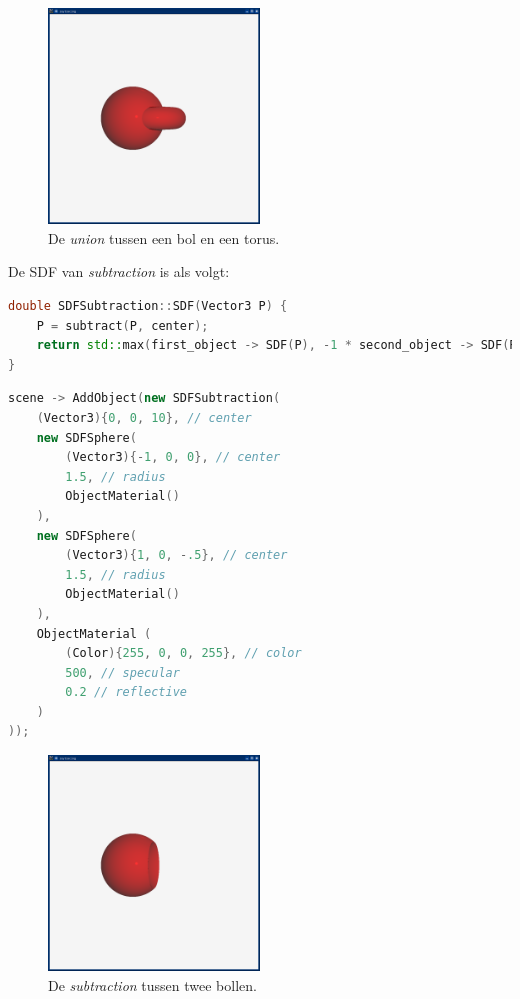 \documentclass[12pt, a4paper]{article}
\begin{document}
\begin{figure}[h]
    \centering
    \includegraphics[width=0.50\textwidth]{renders/union.png}
    \caption{De \emph{union} tussen een bol en een torus.}
    \label{fig:union}
\end{figure}

De SDF van \emph{subtraction} is als volgt:

\begin{lstlisting}[language=C++]
double SDFSubtraction::SDF(Vector3 P) {
    P = subtract(P, center);
    return std::max(first_object -> SDF(P), -1 * second_object -> SDF(P));
}
\end{lstlisting}

\begin{lstlisting}[language=C++]
scene -> AddObject(new SDFSubtraction(
    (Vector3){0, 0, 10}, // center
    new SDFSphere(
        (Vector3){-1, 0, 0}, // center
        1.5, // radius
        ObjectMaterial()
    ),
    new SDFSphere(
        (Vector3){1, 0, -.5}, // center
        1.5, // radius
        ObjectMaterial()
    ),
    ObjectMaterial (
        (Color){255, 0, 0, 255}, // color
        500, // specular
        0.2 // reflective
    )
));
\end{lstlisting}

\begin{figure}[h]
    \centering
    \includegraphics[width=0.50\textwidth]{renders/subtraction.png}
    \caption{De \emph{subtraction} tussen twee bollen.}
    \label{fig:subtraction}
\end{figure}
\end{document}
